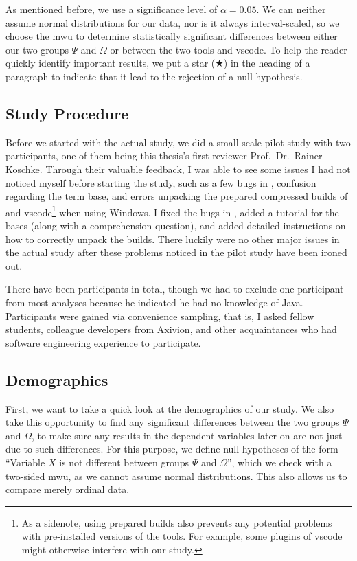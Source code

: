 \documentclass[../thesis]{subfiles}
\begin{document}
As mentioned before, we use a significance level of $\alpha = 0.05$.
We can neither assume normal distributions for our data, nor is it always interval-scaled, so we choose the \gls{mwu} to determine statistically significant differences between either our two groups $\Psi$ and $\Omega$ or between the two tools \SEE{} and \gls{vscode}.
To help the reader quickly identify important results, we put a star ($\bigstar$) in the heading of a paragraph to indicate that it lead to the rejection of a null hypothesis.

\subsection{Study Procedure}\label{subsec:procedure}
Before we started with the actual study, we did a small-scale pilot study with two participants, one of them being this thesis's first reviewer Prof.\ Dr.\ Rainer Koschke.
Through their valuable feedback, I was able to see some issues I had not noticed myself before starting the study, such as a few bugs in \SEE{}, confusion regarding the term \gls{base}, and errors unpacking the prepared compressed builds of \SEE{} and \gls{vscode}\footnote{
	As a sidenote, using prepared builds also prevents any potential problems with pre-installed versions of the tools.
	For example, some plugins of \gls{vscode} might otherwise interfere with our study.
} when using Windows.
I fixed the bugs in \SEE{}, added a tutorial for the \glspl{base} (along with a comprehension question), and added detailed instructions on how to correctly unpack the builds.
There luckily were no other major issues in the actual study after these problems noticed in the pilot study have been ironed out.

There have been \participants participants in total, though we had to exclude one participant from most analyses because he indicated he had no knowledge of Java.
Participants were gained via convenience sampling, that is, I asked fellow students, colleague developers from Axivion, and other acquaintances who had software engineering experience to participate.


\subsection{Demographics}\label{subsec:demographics}

First, we want to take a quick look at the demographics of our study.
We also take this opportunity to find any significant differences between the two groups $\Psi$ and $\Omega$, to make sure any results in the dependent variables later on are not just due to such differences.
For this purpose, we define null hypotheses of the form \enquote{Variable $X$ is not different between groups $\Psi$ and $\Omega$}, which we check with a two-sided \gls{mwu}, as we cannot assume normal distributions.
This also allows us to compare merely ordinal data.
\end{document}
